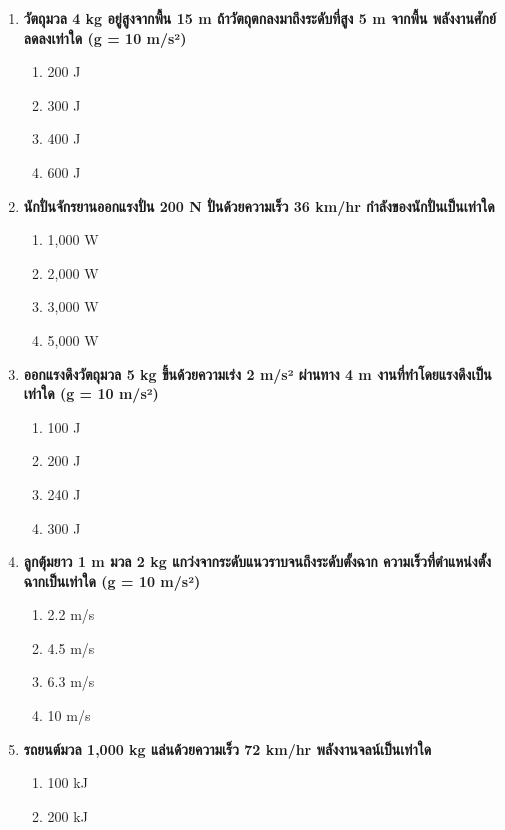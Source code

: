 \documentclass[12pt]{article}
\begin{document}
\begin{enumerate}
\begin{enumerate}[label=\alph*)]
\item 0.1 m
\item 0.2 m
\item 0.4 m
\item 0.5 m
\end{enumerate}
\item \textbf{วัตถุมวล 4 kg อยู่สูงจากพื้น 15 m ถ้าวัตถุตกลงมาถึงระดับที่สูง 5 m จากพื้น พลังงานศักย์ลดลงเท่าใด (g = 10 m/s²)}
\begin{enumerate}[label=\alph*)]
\item 200 J
\item 300 J
\item 400 J
\item 600 J
\end{enumerate}
\item \textbf{นักปั่นจักรยานออกแรงปั่น 200 N ปั่นด้วยความเร็ว 36 km/hr กำลังของนักปั่นเป็นเท่าใด}
\begin{enumerate}[label=\alph*)]
\item 1,000 W
\item 2,000 W
\item 3,000 W
\item 5,000 W
\end{enumerate}
\item \textbf{ออกแรงดึงวัตถุมวล 5 kg ขึ้นด้วยความเร่ง 2 m/s² ผ่านทาง 4 m งานที่ทำโดยแรงดึงเป็นเท่าใด (g = 10 m/s²)}
\begin{enumerate}[label=\alph*)]
\item 100 J
\item 200 J
\item 240 J
\item 300 J
\end{enumerate}
\item \textbf{ลูกตุ้มยาว 1 m มวล 2 kg แกว่งจากระดับแนวราบจนถึงระดับตั้งฉาก ความเร็วที่ตำแหน่งตั้งฉากเป็นเท่าใด (g = 10 m/s²)}
\begin{enumerate}[label=\alph*)]
\item 2.2 m/s
\item 4.5 m/s
\item 6.3 m/s
\item 10 m/s
\end{enumerate}
\item \textbf{รถยนต์มวล 1,000 kg แล่นด้วยความเร็ว 72 km/hr พลังงานจลน์เป็นเท่าใด}
\begin{enumerate}[label=\alph*)]
\item 100 kJ
\item 200 kJ

\end{enumerate}
\end{enumerate}
\end{document}
